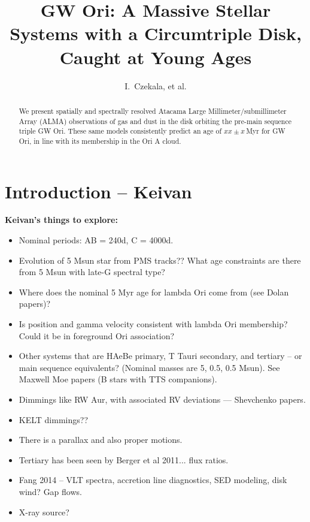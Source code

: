 \documentclass{aastex6}
\begin{document}
\title{GW Ori: A Massive Stellar Systems with a Circumtriple Disk, Caught at Young Ages}
\author{I.~Czekala, et al. }%

\begin{abstract}
We present spatially and spectrally resolved Atacama Large Millimeter/submillimeter Array (ALMA) observations of gas and dust in the disk orbiting the pre-main sequence triple GW Ori. These same models consistently predict an age of $xx\pm x$\,Myr for GW Ori, in line with its membership in the Ori A cloud.
\end{abstract}


\section{Introduction -- {\bf Keivan} \label{sec:intro}}

\noindent
{\bf Keivan's things to explore:}
\begin{itemize}
\item Nominal periods: AB = 240d, C = 4000d.
\item Evolution of 5 Msun star from PMS tracks?? What age constraints are there from 5 Msun with late-G spectral type?
\item Where does the nominal 5 Myr age for lambda Ori come from (see Dolan papers)?
\item Is position and gamma velocity consistent with lambda Ori membership? Could it be in foreground Ori association?
\item Other systems that are HAeBe primary, T Tauri secondary, and tertiary -- or main sequence equivalents? (Nominal masses are 5, 0.5, 0.5 Msun). See Maxwell Moe papers (B stars with TTS companions).
\item Dimmings like RW Aur, with associated RV deviations --- Shevchenko papers.
\item KELT dimmings??
\item There is a parallax and also proper motions.
\item Tertiary has been seen by Berger et al 2011... flux ratios.
\item Fang 2014 -- VLT spectra, accretion line diagnostics, SED modeling, disk wind? Gap flows.
\item X-ray source?
\end{itemize}
\end{document}
